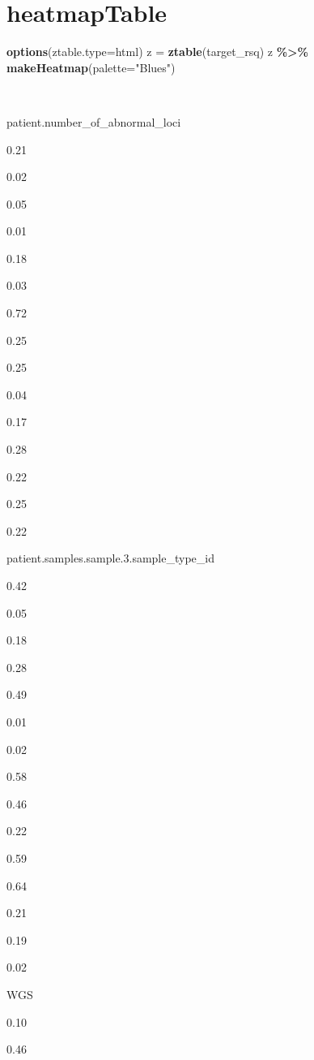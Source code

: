 \documentclass[
]{article}
\newenvironment{Shaded}{\begin{snugshade}}{\end{snugshade}}
\newcommand{\AttributeTok}[1]{\textcolor[rgb]{0.13,0.29,0.53}{#1}}
\newcommand{\FunctionTok}[1]{\textcolor[rgb]{0.13,0.29,0.53}{\textbf{#1}}}
\newcommand{\NormalTok}[1]{#1}
\newcommand{\OtherTok}[1]{\textcolor[rgb]{0.56,0.35,0.01}{#1}}
\newcommand{\SpecialCharTok}[1]{\textcolor[rgb]{0.81,0.36,0.00}{\textbf{#1}}}
\newcommand{\StringTok}[1]{\textcolor[rgb]{0.31,0.60,0.02}{#1}}
\begin{document}
\hypertarget{heatmaptable}{%
\section{heatmapTable}\label{heatmaptable}}

\begin{Shaded}
\begin{Highlighting}[]
\FunctionTok{options}\NormalTok{(}\AttributeTok{ztable.type=}\StringTok{\textquotesingle{}html\textquotesingle{}}\NormalTok{)}
\NormalTok{z }\OtherTok{=} \FunctionTok{ztable}\NormalTok{(target\_rsq)}
\NormalTok{z }\SpecialCharTok{\%\textgreater{}\%} \FunctionTok{makeHeatmap}\NormalTok{(}\AttributeTok{palette=}\StringTok{"Blues"}\NormalTok{)}
\end{Highlighting}
\end{Shaded}

~

patient.number\_of\_abnormal\_loci

0.21

0.02

0.05

0.01

0.18

0.03

0.72

0.25

0.25

0.04

0.17

0.28

0.22

0.25

0.22

patient.samples.sample.3.sample\_type\_id

0.42

0.05

0.18

0.28

0.49

0.01

0.02

0.58

0.46

0.22

0.59

0.64

0.21

0.19

0.02

WGS

0.10

0.46
\end{document}
